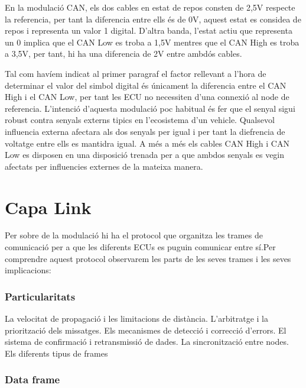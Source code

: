 \documentclass{tfgitic}[2024/07/01]
\begin{document}
En la modulació CAN, els dos cables en estat de repos consten de 2,5V respecte la referencia, 
per tant la diferencia entre ells és de 0V, aquest estat es considea de repos i representa un 
valor 1 digital. D'altra banda, l’estat actiu que representa un 0 implica que el CAN Low es troba 
a 1,5V mentres que el CAN High es troba a 3,5V, per tant, hi ha una diferencia de 2V entre ambdós cables.

Tal com havíem indicat al primer paragraf el factor rellevant a l’hora de determinar el valor del simbol 
digital és únicament la diferencia entre el CAN High i el CAN Low, per tant les ECU no necessiten d’una 
connexió al node de referencia. L’intenció d’aquesta modulació poc habitual és fer que el senyal sigui robust 
contra senyals externs tipics en l’ecosistema d’un vehicle. Qualsevol influencia externa afectara als dos 
senyals per igual i per tant la diefrencia de voltatge entre ells es mantidra igual. A més a més els cables 
CAN High i CAN Low es disposen en una disposició trenada per a que ambdos senyals es vegin afectats per influencies 
externes de la mateixa manera.  


\chapter{Capa Link}

Per sobre de la modulació hi ha el protocol que organitza les trames de comunicació per a que les diferents 
ECUs es puguin comunicar entre sí.Per comprendre aquest protocol observarem les parts de les seves trames 
i les seves implicacions:

\subsection*{Particularitats}

La velocitat de propagació i les limitacions de distància.
L'arbitratge i la priorització dels missatges.
Els mecanismes de detecció i correcció d'errors.
El sistema de confirmació i retransmissió de dades.
La sincronització entre nodes.
Els diferents tipus de frames

\subsection*{Data frame}
\end{document}
